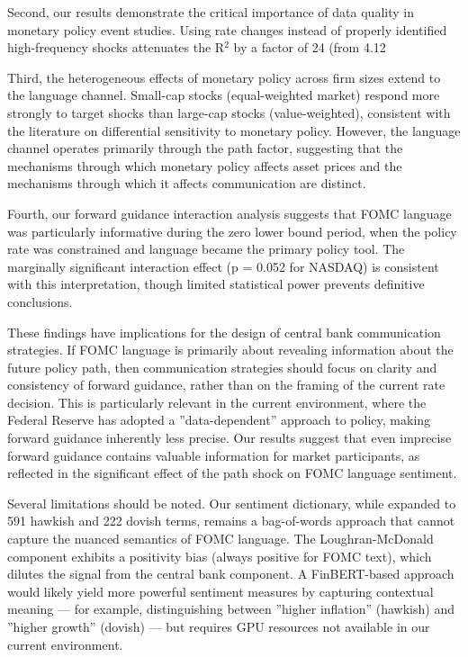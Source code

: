\documentclass[12pt]{article}
\begin{document}
Second, our results demonstrate the critical importance of data quality in monetary policy event studies. Using rate changes instead of properly identified high-frequency shocks attenuates the R$^2$ by a factor of 24 (from 4.12%

Third, the heterogeneous effects of monetary policy across firm sizes extend to the language channel. Small-cap stocks (equal-weighted market) respond more strongly to target shocks than large-cap stocks (value-weighted), consistent with the literature on differential sensitivity to monetary policy. However, the language channel operates primarily through the path factor, suggesting that the mechanisms through which monetary policy affects asset prices and the mechanisms through which it affects communication are distinct.

Fourth, our forward guidance interaction analysis suggests that FOMC language was particularly informative during the zero lower bound period, when the policy rate was constrained and language became the primary policy tool. The marginally significant interaction effect (p = 0.052 for NASDAQ) is consistent with this interpretation, though limited statistical power prevents definitive conclusions.

These findings have implications for the design of central bank communication strategies. If FOMC language is primarily about revealing information about the future policy path, then communication strategies should focus on clarity and consistency of forward guidance, rather than on the framing of the current rate decision. This is particularly relevant in the current environment, where the Federal Reserve has adopted a ''data-dependent'' approach to policy, making forward guidance inherently less precise. Our results suggest that even imprecise forward guidance contains valuable information for market participants, as reflected in the significant effect of the path shock on FOMC language sentiment.

Several limitations should be noted. Our sentiment dictionary, while expanded to 591 hawkish and 222 dovish terms, remains a bag-of-words approach that cannot capture the nuanced semantics of FOMC language. The Loughran-McDonald component exhibits a positivity bias (always positive for FOMC text), which dilutes the signal from the central bank component. A FinBERT-based approach would likely yield more powerful sentiment measures by capturing contextual meaning --- for example, distinguishing between ''higher inflation'' (hawkish) and ''higher growth'' (dovish) --- but requires GPU resources not available in our current environment.
\end{document}

